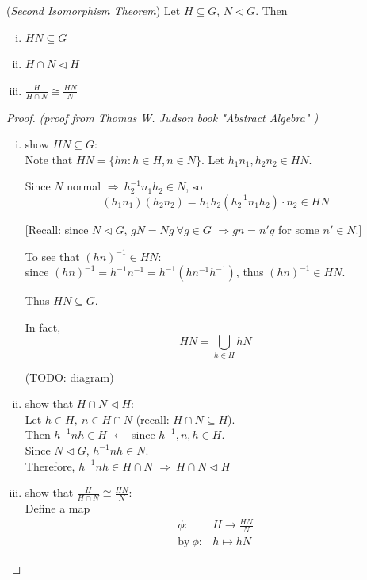 \documentclass{article}
\theoremstyle{definition}
\newenvironment{thm}[1]
{\renewcommand\theinnerthm{#1}\innerthm}
{\endinnerthm}
\begin{document}
\begin{thm}{i.2}(\emph{Second Isomorphism Theorem}) \label{2ndisothm}
  Let $H \subseteq G$, $N \triangleleft G$. Then
  \begin{enumerate}[i.]
    \item $HN \subseteq G$
    \item $H \cap N \triangleleft H$
    \item $\frac{H}{H \cap N} \cong \frac{HN}{N}$
  \end{enumerate}
\end{thm}
\begin{proof}
  \emph{(proof from Thomas W. Judson book "Abstract Algebra" \cite{judson})}\\

  \begin{enumerate}[i.]
    \item show $HN \subseteq G$:\\
      Note that $HN = \{ hn : h\in H, n\in N \}$. Let $h_1 n_1, h_2 n_2 \in HN$.

      Since $N$ normal $\Longrightarrow~ h_2^{-1} n_1 h_2 \in N$, so
      $$(h_1 n_1)(h_2 n_2) = h_1 h_2 (h_2^{-1} n_1 h_2) \cdot n_2 \in HN$$

      [Recall: since $N \triangleleft G$, $gN=Ng ~\forall g \in G$ $\Longrightarrow gn=n'g$ for some $n' \in N$.]

      To see that $(hn)^{-1} \in HN$:\\
      since $(hn)^{-1} = h^{-1} n^{-1} = h^{-1} (h n^{-1} h^{-1})$, thus $(hn)^{-1} \in HN$.

      Thus $HN \subseteq G$.


      In fact, $$HN = \bigcup_{h \in H} hN$$

      (TODO: diagram)

    \item show that $H \cap N \triangleleft H$:\\
      Let $h \in H,~ n \in H \cap N$ (recall: $H \cap N \subseteq H$).\\
      Then $h^{-1}nh \in H$ $\longleftarrow$ since $h^{-1}, n, h \in H$.\\
      Since $N \triangleleft G$, $h^{-1} n h \in N$.\\
      Therefore, $h^{-1}nh \in H \cap N$ $\Longrightarrow~ H \cap N \triangleleft H$

    \item show that $\frac{H}{H \cap N} \cong \frac{HN}{N}$:\\
      Define a map
      \begin{align*}
	\phi: &H \longrightarrow \frac{HN}{N}\\
	\text{by}~ \phi: &h \longmapsto hN
      \end{align*}


\end{enumerate}
\end{proof}
\end{document}
